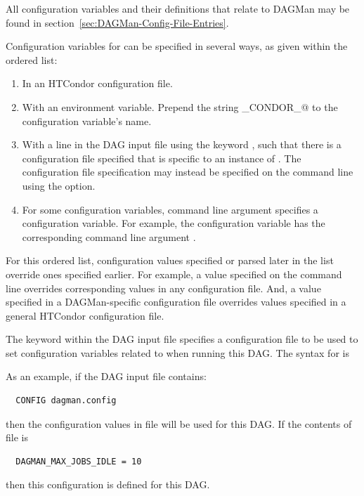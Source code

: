 All configuration variables and their definitions that relate to 
DAGMan may be found in section~\ref{sec:DAGMan-Config-File-Entries}.

Configuration variables for  can be specified in several
ways, as given within the ordered list:
\begin{enumerate}
\item
In an HTCondor configuration file.
\item
With an environment variable.
Prepend the string \verb@_CONDOR_@ to the configuration variable's name.
\item
With a line in the DAG input file using the keyword , 
such that there is a configuration file specified
that is specific to an instance of .
The configuration file specification may instead be specified
on the  command line using the  option.
\item
For some configuration variables,
 command line argument specifies a configuration variable. 
For example, the configuration variable 
has the corresponding command line argument .
\end{enumerate}

For this ordered list, 
configuration values specified or parsed later in the list
override ones specified earlier.
For example, a value specified on the
 command line overrides corresponding values in any
configuration file.
And, a value specified in a DAGMan-specific configuration
file overrides values specified in a general HTCondor configuration file.

The  keyword within the DAG input file specifies a 
configuration file to be used to set configuration variables 
related to  when running this DAG.
The syntax for  is

 

As an example, if the DAG input file contains:
\begin{verbatim}
  CONFIG dagman.config
\end{verbatim}
then the configuration values in file  will be used
for this DAG.
If the contents of file  is 
\begin{verbatim}
  DAGMAN_MAX_JOBS_IDLE = 10
\end{verbatim}
then this configuration is defined for this DAG. 

